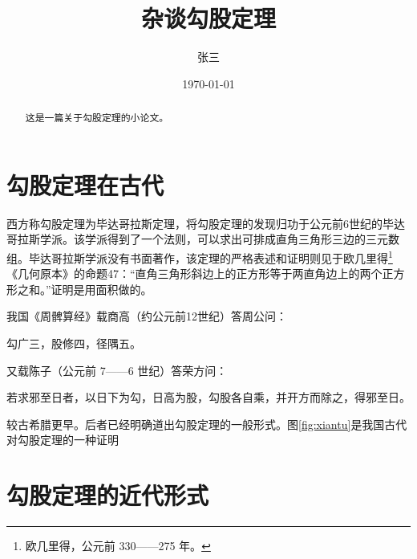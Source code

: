 \documentclass{article}  %
\begin{document}
	
	
	\title{杂谈勾股定理}  %
	\author{张三}  %
	\date{\today}    %
	\maketitle     %
	
	
	\begin{abstract}         %
		\small\centering 这是一篇关于勾股定理的小论文。
	\end{abstract}


	
	\tableofcontents  %
	
	
	\section{勾股定理在古代}  \label{sec:ancient}
	\small 西方称勾股定理为毕达哥拉斯定理，将勾股定理的发现归功于公元前6世纪的毕达哥拉斯学派\cite{Kline}。该学派得到了一个法则，可以求出可排成直角三角形三边的三元数组。毕达哥拉斯学派没有书面著作，该定理的严格表述和证明则见于欧几里得\footnote{欧几里得，公元前 330——275 年。}《几何原本》的命题47：“直角三角形斜边上的正方形等于两直角边上的两个正方形之和。”证明是用面积做的。
	
	\small 我国《周髀算经》载商高（约公元前12世纪）答周公问：
	
	\footnotesize\centering 勾广三，股修四，径隅五。
	
	\small 又载陈子（公元前 7——6 世纪）答荣方问：
	
	
	\footnotesize\centering 若求邪至日者，以日下为勾，日高为股，勾股各自乘，并开方而除之，得邪至日。
	
	\small 较古希腊更早。后者已经明确道出勾股定理的一般形式。图\ref{fig:xiantu}是我国古代对勾股定理的一种证明\cite{quanjing}
	\section{勾股定理的近代形式}
	
	
	
\end{document}
